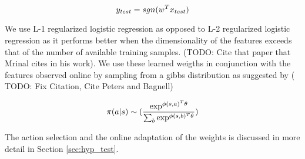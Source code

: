 \[
y_{test} = sgn(w^Tx_{test})\\
\]

We use L-1 regularized logistic regression as opposed to L-2 regularized logistic regression as it performs better when the dimensionality of the features exceeds that of the number of available training samples. (TODO: Cite that paper that Mrinal cites in his work). We use these learned weigths in conjunction with the features observed online by sampling from a gibbs distribution as suggested by (\cite{Javidi12_Journal} TODO: Fix Citation, Cite Peters and Bagnell)

\[
\pi(a|s) \sim (\frac{\exp^{\phi(s,a)^T\theta}}{ \sum_b\exp^{\phi(s,b)^T\theta}})\\
\]

The action selection and the online adaptation of the weights is discussed in more detail in Section \ref{sec:hyp_test}.


